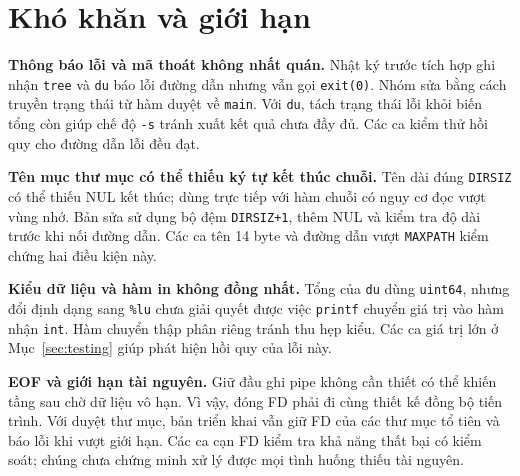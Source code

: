 \documentclass[12pt,a4paper]{article}
\newcommand{\code}[1]{\texttt{#1}}
\begin{document}
\clearpage
\section{Khó khăn và giới hạn}\label{sec:limits}
\textbf{Thông báo lỗi và mã thoát không nhất quán.} Nhật ký trước tích hợp ghi nhận \code{tree} và \code{du} báo lỗi đường dẫn nhưng vẫn gọi \code{exit(0)}. Nhóm sửa bằng cách truyền trạng thái từ hàm duyệt về \code{main}. Với \code{du}, tách trạng thái lỗi khỏi biến tổng còn giúp chế độ \code{-s} tránh xuất kết quả chưa đầy đủ. Các ca kiểm thử hồi quy cho đường dẫn lỗi đều đạt.

\textbf{Tên mục thư mục có thể thiếu ký tự kết thúc chuỗi.} Tên dài đúng \code{DIRSIZ} có thể thiếu NUL kết thúc; dùng trực tiếp với hàm chuỗi có nguy cơ đọc vượt vùng nhớ. Bản sửa sử dụng bộ đệm \code{DIRSIZ+1}, thêm NUL và kiểm tra độ dài trước khi nối đường dẫn. Các ca tên 14 byte và đường dẫn vượt \code{MAXPATH} kiểm chứng hai điều kiện này.

\textbf{Kiểu dữ liệu và hàm in không đồng nhất.} Tổng của \code{du} dùng \code{uint64}, nhưng đổi định dạng sang \code{\%lu} chưa giải quyết được việc \code{printf} chuyển giá trị vào hàm nhận \code{int}. Hàm chuyển thập phân riêng tránh thu hẹp kiểu. Các ca giá trị lớn ở Mục~\ref{sec:testing} giúp phát hiện hồi quy của lỗi này.

\textbf{EOF và giới hạn tài nguyên.} Giữ đầu ghi pipe không cần thiết có thể khiến tầng sau chờ dữ liệu vô hạn. Vì vậy, đóng FD phải đi cùng thiết kế đồng bộ tiến trình. Với duyệt thư mục, bản triển khai vẫn giữ FD của các thư mục tổ tiên và báo lỗi khi vượt giới hạn. Các ca cạn FD kiểm tra khả năng thất bại có kiểm soát; chúng chưa chứng minh xử lý được mọi tình huống thiếu tài nguyên.
\end{document}
